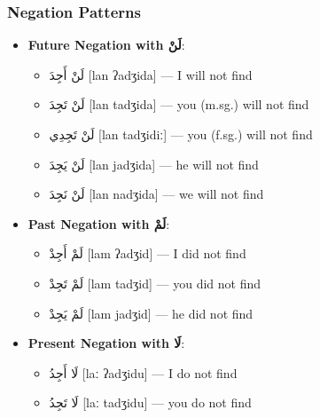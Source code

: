 \documentclass[letterpaper,12pt]{article}
\begin{document}
\subsubsection*{Negation Patterns}
\begin{itemize}
  \item \textbf{Future Negation with \textarabic{لَنْ}}: 
    \begin{itemize}
      \item \textarabic{لَنْ أَجِدَ} [lan ʔadʒida] — I will not find
      \item \textarabic{لَنْ تَجِدَ} [lan tadʒida] — you (m.sg.) will not find
      \item \textarabic{لَنْ تَجِدِي} [lan tadʒidiː] — you (f.sg.) will not find
      \item \textarabic{لَنْ يَجِدَ} [lan jadʒida] — he will not find
      \item \textarabic{لَنْ نَجِدَ} [lan nadʒida] — we will not find
    \end{itemize}
  \item \textbf{Past Negation with \textarabic{لَمْ}}: 
    \begin{itemize}
      \item \textarabic{لَمْ أَجِدْ} [lam ʔadʒid] — I did not find
      \item \textarabic{لَمْ تَجِدْ} [lam tadʒid] — you did not find
      \item \textarabic{لَمْ يَجِدْ} [lam jadʒid] — he did not find
    \end{itemize}
  \item \textbf{Present Negation with \textarabic{لَا}}: 
    \begin{itemize}
      \item \textarabic{لَا أَجِدُ} [laː ʔadʒidu] — I do not find
      \item \textarabic{لَا تَجِدُ} [laː tadʒidu] — you do not find
    \end{itemize}
\end{itemize}
\end{document}

